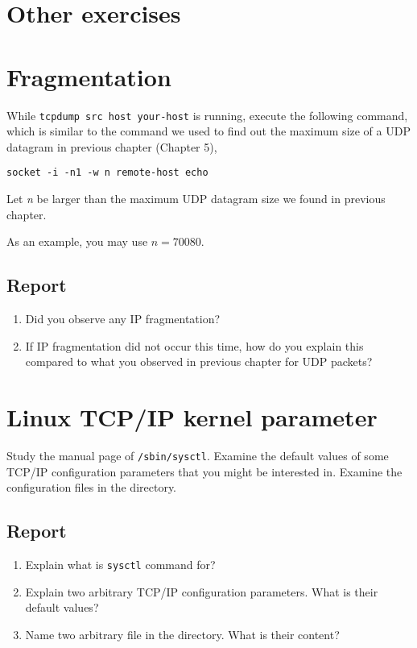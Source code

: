 \documentclass{../UTNetLab}
\begin{document}
\section*{Other exercises}
\section{Fragmentation}
    While \lstinline[emph={your-host, remote-host}]{tcpdump src host your-host} is running, execute the following command, which is similar to the command we used to find out the maximum size of a UDP datagram in previous chapter (Chapter 5),
    \begin{lstlisting}[emph={n, remote-host}]
socket -i -n1 -w n remote-host echo
    \end{lstlisting}
    Let \textit{n} be larger than the maximum UDP datagram size we found in previous chapter.

    As an example, you may use $n = 70080$.
    \subsection*{Report}
    \begin{enumerate}
        \item Did you observe any IP fragmentation?
        \item If IP fragmentation did not occur this time, how do you explain this compared to what you observed in previous chapter for UDP packets?
    \end{enumerate}

\section{Linux TCP/IP kernel parameter}
    Study the manual page of \lstinline{/sbin/sysctl}.
    Examine the default values of some TCP/IP configuration parameters that you might be interested in.
    Examine the configuration files in the  directory.
    \subsection*{Report}
    \begin{enumerate}
        \item Explain what is \lstinline{sysctl} command for?
        \item Explain two arbitrary TCP/IP configuration parameters. What is their default values?
        \item Name two arbitrary file in the  directory. What is their content?
    \end{enumerate}
\end{document}
